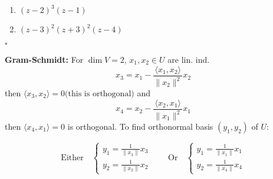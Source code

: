 \documentclass[10pt]{article}
\newenvironment{proof}{\noindent{\bf Proof.}}{\hfill $\square$\medskip}
\begin{document}
\begin{enumerate}
        \begin{proof}
            \begin{enumerate}[label=\textbf{(\alph*)}]
                \item $(z-2)^{3}(z-1)$
                \item $(z-3)^{2}(z+3)^{2}(z-4)$
            \end{enumerate}
        \end{proof}

        
        \textbf{Gram-Schmidt:} For $\dim V=2$, $x_{1},x_{2}\in U$ are lin. ind.
        $$x_{3}=x_{1}-\frac{\langle x_{1},x_{2}\rangle}{\lVert x_{2}\rVert^{2}}x_{2}$$
        then $\langle x_{3},x_{2}\rangle=0 \text{(this is orthogonal)}$ and
        $$x_{4}=x_{2}-\frac{\langle x_{2},x_{1}\rangle}{\lVert x_{1}\rVert^{2}}x_{1}$$
        then $\langle x_{4},x_{1}\rangle=0$ is orthogonal.
        To find orthonormal basis $(y_{1},y_{2})$ of $U$:

        
        $$
        \text{Either}\quad
        \begin{cases}
            y_{1}=\frac{1}{\lVert x_{3}\rVert}x_{3}\\
            y_{2}=\frac{1}{\lVert x_{2}\rVert}x_{2}
        \end{cases}
        \qquad\text{Or}\quad
        \begin{cases}
            y_{1}=\frac{1}{\lVert x_{1}\rVert}x_{1}\\
            y_{2}=\frac{1}{\lVert x_{4}\rVert}x_{4}
        \end{cases}
        $$
    \end{enumerate}
\end{document}
